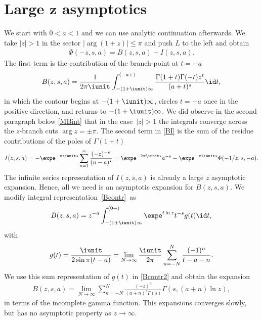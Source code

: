 \section[Large z asymptotics]{Large $\boldsymbol{z}$ asymptotics}\label{Sect:largez}
We start with $0<a<1$ and we can use analytic continuation afterwards.
We take $|z|>1$ in the sector $|\arg(1+z)|\leq\pi$ and push $L$ to the left and obtain
\begin{gather}\label{BI}
 \Phi(-z,s,a)=B(z,s,a)+I(z,s,a).
\end{gather}
The first term is the contribution of the branch-point at $t=-a$
\begin{gather}\label{Bcontr}
 B(z,s,a)=\frac1{2\pi\iunit}\int_{-(1+\iunit)\infty}^{(-a+)}
 \frac{\Gamma(1+t)\Gamma(-t)z^t}{(a+t)^s}\id t,
\end{gather}
in which the contour begins at $-(1+\iunit)\infty$, circles $t=-a$ once in the positive direction,
and returns to $-(1+\iunit)\infty$. We did observe in the second paragraph below \eqref{MBint}
that in the case~$|z|>1$ the integrals converge across the $z$-branch cuts $\arg z=\pm\pi$.
The second term in \eqref{BI} is the sum of the residue contributions of the poles of $\Gamma(1+t)$
\begin{gather}\label{Icontr}
 I(z,s,a)=-\expe^{-\pi\iunit s}\sum_{n=1}^\infty\frac{(-z)^{-n}}{(n-a)^s}
 =\expe^{-2\pi\iunit s}a^{-s}-\expe^{-\pi\iunit s}\Phi (-1/z,s,-a ).
\end{gather}
The infinite series representation of $I(z,s,a)$ is already a large $z$ asymptotic
expansion. Hence, all we need is an asymptotic expansion for $B(z,s,a)$. We
modify integral representation~\eqref{Bcontr}~as%
\begin{gather}\label{Bcontr2}
 B(z,s,a)=z^{-a}\int_{-(1+\iunit)\infty}^{(0+)}
 \expe^{t\ln z} t^{-s}g(t)\id t,
\end{gather}
with
\begin{gather}\label{g}
 g(t)=\frac{\iunit}{2\sin\pi(t-a)}
 =\lim_{N\to\infty} \frac{\iunit}{2\pi}\sum_{n=-N}^N\frac{(-1)^n}{t-a-n}.
\end{gather}
We use this sum representation of $g(t)$ in \eqref{Bcontr2} and obtain the expansion
\begin{gather}\label{Bgamma}
 B(z,s,a)=\lim_{N\to\infty} \sum_{n=-N}^N \frac{(-z)^n}{(a+n)^s\Gamma(s)}
 \Gamma(s,(a+n)\ln z),
\end{gather}
in terms of the incomplete gamma function. This expansions converges slowly, but has no asymptotic
property as $z\to\infty$.

